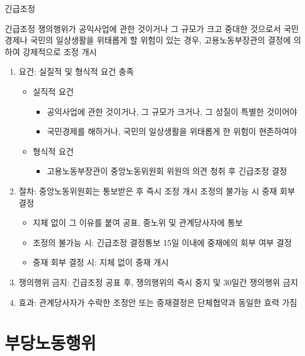 \documentclass[aspectratio=169,xcolor=dvipsnames,handout]{beamer}
\begin{document}
\begin{frame}[allowframebreaks]{긴급조정}
    \begin{block}{긴급조정}
        쟁의행위가 공익사업에 관한 것이거나 그 규모가 크고 중대한 것으로서 국민경제나 국민의 일상생활을 위태롭게 할 위험이 있는 경우, 고용노동부장관의 결정에 의하여 강제적으로 조정 개시
    \end{block}
    \begin{enumerate}[<+->]
        \item 요건: 실질적 및 형식적 요건 충족
        \begin{itemize}[<+->]
            \item 실직적 요건
            \begin{itemize}[<+->]
                \item 공익사업에 관한 것이거나, 그 규모가 크거나, 그 성질이 특별한 것이어야
                \item 국민경제를 해하거나, 국민의 일상생활을 위태롭게 한 위험이 현존하여야
            \end{itemize}
            \item 형식적 요건
            \begin{itemize}[<+->]
                \item 고용노동부장관이 중앙노동위원회 위원의 의견 청취 후 긴급조정 결정
            \end{itemize}
        \end{itemize}
        \item 절차: 중앙노동위원회는 통보받은 후 즉시 조정 개시 조정의 불가능 시 중재 회부 결정
        \begin{itemize}[<+->]
            \item 지체 없이 그 이유를 붙여 공표, 중노위 및 관계당사자에 통보
            \item 조정의 불가능 시: 긴급조정 결정통보 15일 이내에 중재에의 회부 여부 결정
            \item 중재 회부 결정 시: 지체 없이 중재 개시
        \end{itemize}
        \item 쟁의행위 금지: 긴급조정 공표 후, 쟁의행위의 즉시 중지 및 30일간 쟁의행위 금지
        \item 효과: 관계당사자가 수락한 조정안 또는 중재결정은 단체협약과 동일한 효력 가짐
    \end{enumerate}
\end{frame}

\section{부당노동행위}%
\end{document}
